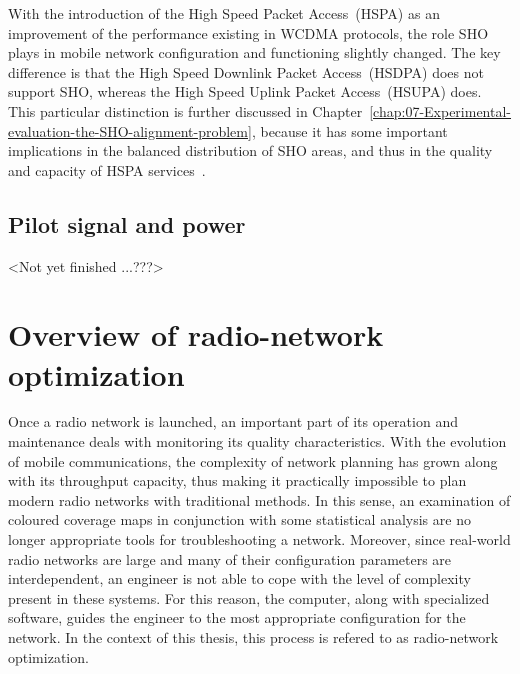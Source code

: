 With the introduction of the High Speed Packet Access~(HSPA)
as an improvement of the performance existing in WCDMA protocols,
the role SHO plays in mobile network configuration and functioning
slightly changed. The key difference is that the High Speed Downlink
Packet Access~(HSDPA)
does not support SHO, whereas the High Speed Uplink Packet Access~(HSUPA)
does. This particular distinction is further discussed in Chapter~\ref{chap:07-Experimental-evaluation-the-SHO-alignment-problem},
because it has some important implications in the balanced distribution
of SHO areas, and thus in the quality and capacity of HSPA services~\cite{holma2006hsdpa}.


\section{Pilot signal and power \label{sub:02-Pilot-signal-and-power}}

<Not yet finished ...???>




\chapter{Overview of radio-network optimization \label{chap:02-Optimization_of_radio_networks}}

Once a radio network is launched, an important part of its operation
and maintenance deals with monitoring its quality characteristics.
With the evolution of mobile communications, the complexity of network
planning has grown along with its throughput capacity, thus making
it practically impossible to plan modern radio networks with traditional
methods. In this sense, an examination of coloured coverage maps in
conjunction with some statistical analysis are no longer appropriate
tools for troubleshooting a network. Moreover, since real-world radio
networks are large and many of their configuration parameters are
interdependent, an engineer is not able to cope with the level of
complexity present in these systems. For this reason, the computer,
along with specialized software, guides the engineer to the most appropriate
configuration for the network. In the context of this thesis, this
process is refered to as radio-network optimization.

